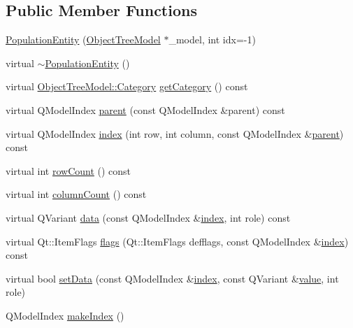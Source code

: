 \subsection*{Public Member Functions}
\begin{DoxyCompactItemize}
\item 
\mbox{\hyperlink{classobjecttree_1_1_population_entity_aa647a66e5f248b396f310134e23fe4cb}{Population\+Entity}} (\mbox{\hyperlink{class_object_tree_model}{Object\+Tree\+Model}} $\ast$\+\_\+model, int idx=-\/1)
\item 
virtual \mbox{\hyperlink{classobjecttree_1_1_population_entity_a21ed403c057be93809a47af080993b23}{$\sim$\+Population\+Entity}} ()
\item 
virtual \mbox{\hyperlink{class_object_tree_model_a379e9d6b0d381853785adf62095ba4e3}{Object\+Tree\+Model\+::\+Category}} \mbox{\hyperlink{classobjecttree_1_1_population_entity_a33b674727f9f1aa1bcebd65e07b30e8d}{get\+Category}} () const
\item 
virtual Q\+Model\+Index \mbox{\hyperlink{classobjecttree_1_1_population_entity_a1b9bbc71a7630b2b441f94bbf2725810}{parent}} (const Q\+Model\+Index \&parent) const
\item 
virtual Q\+Model\+Index \mbox{\hyperlink{classobjecttree_1_1_population_entity_a66228e77f0aff3907f18a3a629e37136}{index}} (int row, int column, const Q\+Model\+Index \&\mbox{\hyperlink{classobjecttree_1_1_population_entity_a1b9bbc71a7630b2b441f94bbf2725810}{parent}}) const
\item 
virtual int \mbox{\hyperlink{classobjecttree_1_1_population_entity_a3701a9792edfaf28e1273f6cd2357b37}{row\+Count}} () const
\item 
virtual int \mbox{\hyperlink{classobjecttree_1_1_population_entity_a6dee0de9ebe1f3929dbd6280aa884760}{column\+Count}} () const
\item 
virtual Q\+Variant \mbox{\hyperlink{classobjecttree_1_1_population_entity_a1b61b36e9dc259bae63cf5cc6427f7c6}{data}} (const Q\+Model\+Index \&\mbox{\hyperlink{classobjecttree_1_1_population_entity_a66228e77f0aff3907f18a3a629e37136}{index}}, int role) const
\item 
virtual Qt\+::\+Item\+Flags \mbox{\hyperlink{classobjecttree_1_1_population_entity_a9da7b5ae9e92f9690921af7796cbb799}{flags}} (Qt\+::\+Item\+Flags defflags, const Q\+Model\+Index \&\mbox{\hyperlink{classobjecttree_1_1_population_entity_a66228e77f0aff3907f18a3a629e37136}{index}}) const
\item 
virtual bool \mbox{\hyperlink{classobjecttree_1_1_population_entity_ac7f56619658a100d8afd9418df96463b}{set\+Data}} (const Q\+Model\+Index \&\mbox{\hyperlink{classobjecttree_1_1_population_entity_a66228e77f0aff3907f18a3a629e37136}{index}}, const Q\+Variant \&\mbox{\hyperlink{diffusion_8cpp_a4b41795815d9f3d03abfc739e666d5da}{value}}, int role)
\item 
Q\+Model\+Index \mbox{\hyperlink{classobjecttree_1_1_population_entity_ad15c8a5d3ea897832b47036f51a4b5bd}{make\+Index}} ()
\end{DoxyCompactItemize}
